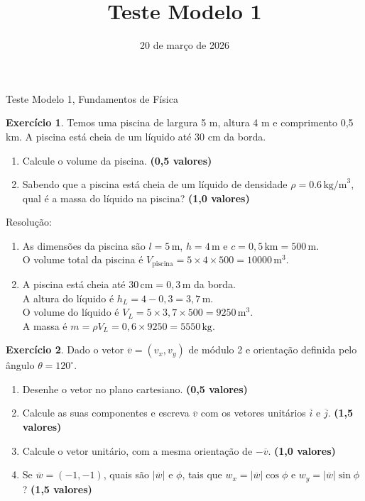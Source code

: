 \documentclass[12pt]{article}
\title{Teste Modelo 1}
\author{}
\date{20 de março de 2026}
\newcommand{\cabecalho}{
	\hfill
	\begin{minipage}[t]{0.7\textwidth}
		\raggedleft
		Teste Modelo 1, Fundamentos de Física
	\end{minipage}
	
}
\newcommand{\pontos}[1]{\hfill\textbf{(#1 valores)}}
\begin{document}
	
	\cabecalho
	
	\textbf{Exercício 1}. Temos uma piscina de largura 5 m, altura 4 m e comprimento 0,5 km. A piscina está cheia de um líquido até 30 cm da borda.
	\begin{enumerate}[label=\alph*)]
		\item Calcule o volume da piscina. \pontos{0,5}
		\item Sabendo que a piscina está cheia de um líquido de densidade $\rho = 0.6\,\text{kg/m}^3$, qual é a massa do líquido na piscina? \pontos{1,0}
	\end{enumerate}
	
	\vspace{0.4cm}
	Resolução:
	\begin{enumerate}[label=\alph*), itemsep=12pt]
		\item As dimensões da piscina são $l = 5\,\text{m}$, $h = 4\,\text{m}$ e $c = 0,5\,\text{km} = 500\,\text{m}$. \\
		O volume total da piscina é $V_{\text{piscina}} = 5 \times 4 \times 500 = 10000\,\text{m}^3$.
		
		\item A piscina está cheia até $30\,\text{cm} = 0,3\,\text{m}$ da borda. \\
		A altura do líquido é $h_L = 4 - 0,3 = 3,7\,\text{m}$. \\
		O volume do líquido é $V_L = 5 \times 3,7 \times 500 = 9250\,\text{m}^3$. \\
		A massa é $m = \rho V_L = 0,6 \times 9250 = 5550\,\text{kg}$.
	\end{enumerate}
	
	\vspace{1.5cm}
	
	\textbf{Exercício 2}. Dado o vetor $\overline{v} = (v_x, v_y)$ de módulo 2 e orientação definida pelo ângulo $\theta = 120^\circ$.
	\begin{enumerate}[label=\alph*)]
		\item Desenhe o vetor no plano cartesiano. \pontos{0,5}
		\item Calcule as suas componentes e escreva $\overline{v}$ com os vetores unitários $\overline{i}$ e $\overline{j}$. \pontos{1,5}
		\item Calcule o vetor unitário, com a mesma orientação de $-\overline{v}$. \pontos{1,0}
		\item Se $\overline{w} = (-1,-1)$, quais são $|\overline{w}|$ e $\phi$, tais que $w_x = |\overline{w}| \cos \phi$ e $w_y = |\overline{w}| \sin \phi$? \pontos{1,5}
	\end{enumerate}
	
\end{document}
